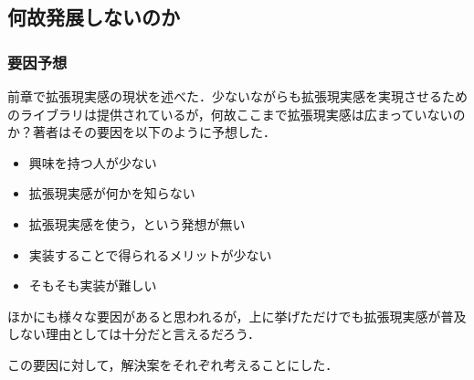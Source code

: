 \subsection{何故発展しないのか}

\subsubsection{要因予想}
前章で拡張現実感の現状を述べた．少ないながらも拡張現実感を実現させるためのライブラリは提供されているが，何故ここまで拡張現実感は広まっていないのか？著者はその要因を以下のように予想した．

\begin{itemize}
 \item 興味を持つ人が少ない
 \item 拡張現実感が何かを知らない
 \item 拡張現実感を使う，という発想が無い
 \item 実装することで得られるメリットが少ない
 \item そもそも実装が難しい
\end{itemize}

ほかにも様々な要因があると思われるが，上に挙げただけでも拡張現実感が普及しない理由としては十分だと言えるだろう．
\par \vspace{5pt}
この要因に対して，解決案をそれぞれ考えることにした．

